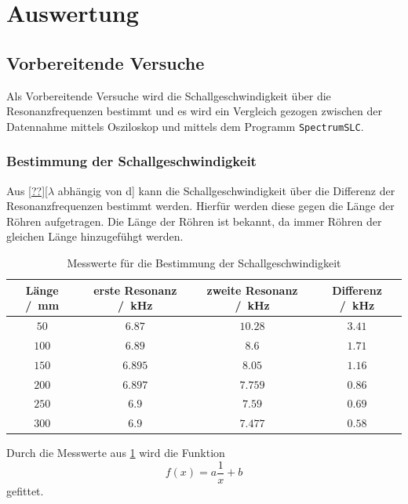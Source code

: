 \section{Auswertung}
\label{sec:Auswertung}
\subsection{Vorbereitende Versuche}
Als Vorbereitende Versuche wird die Schallgeschwindigkeit über die Resonanzfrequenzen bestimmt und es wird ein Vergleich gezogen
zwischen der Datennahme mittels Osziloskop und mittels dem Programm \texttt{SpectrumSLC}.
\subsubsection{Bestimmung der Schallgeschwindigkeit}
Aus \eqref{??}[$\lambda$ abhängig von d] kann die Schallgeschwindigkeit über die Differenz der Resonanzfrequenzen
bestimmt werden. Hierfür werden diese gegen die Länge der Röhren aufgetragen. Die Länge der Röhren ist bekannt, da immer Röhren 
der gleichen Länge hinzugefühgt werden.
\FloatBarrier
\begin{table}
    \centering
    \caption{Messwerte für die Bestimmung der Schallgeschwindigkeit}
    \label{tab:Schallgeschwindigkeit}
    \begin{tabular}{c c c c}
        \toprule
        Länge /\SI{}{\milli\meter}& erste Resonanz /\SI{}{\kilo\hertz} & zweite Resonanz /\SI{}{\kilo\hertz}& Differenz /\SI{}{\kilo\hertz}\\
        \midrule
        $\num{50}$&$\num{6.87}$&$\num{10.28}$&$\num{3.41}$\\
        $\num{100}$&$\num{6.89}$&$\num{8.6}$&$\num{1.71}$\\
        $\num{150}$&$\num{6.895}$&$\num{8.05}$&$\num{1.16}$\\
        $\num{200}$&$\num{6.897}$&$\num{7.759}$&$\num{0.86}$\\
        $\num{250}$&$\num{6.9}$&$\num{7.59}$&$\num{0.69}$\\
        $\num{300}$&$\num{6.9}$&$\num{7.477}$&$\num{0.58}$\\
        \bottomrule
    \end{tabular}
\end{table}
\FloatBarrier
Durch die Messwerte aus \ref{tab:Schallgeschwindigkeit} wird die Funktion
\begin{equation*}
    f(x) = a \frac{1}{x} + b
\end{equation*}
gefittet.\\
